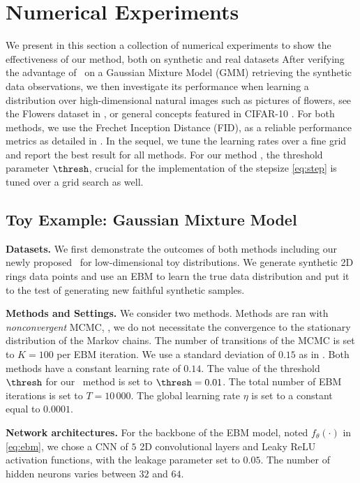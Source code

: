\documentclass[10pt,twocolumn,letterpaper]{article}
\begin{document}
\section{Numerical Experiments}\label{sec:numericals}


We present in this section a collection of numerical experiments to show the effectiveness of our method, both on synthetic and real datasets
After verifying the advantage of \algo\ on a Gaussian Mixture Model (GMM) retrieving the synthetic data observations, we then investigate its performance when learning a distribution over high-dimensional natural images such as pictures of flowers, see the Flowers dataset in \cite{nilsback2008automated}, or general concepts featured in CIFAR-10 \cite{krizhevsky2009learning}.
For both methods, we use the Frechet Inception Distance (FID), as a reliable performance metrics as detailed in \cite{heusel2017gans}.
In the sequel, we tune the learning rates over a fine grid and report the best result for all methods.
For our method \algo, the threshold parameter $\thresh$, crucial for the implementation of the stepsize \eqref{eq:step} is tuned over a grid search as well.

\subsection{Toy Example: Gaussian Mixture Model}

\textbf{Datasets.}
We first demonstrate the outcomes of both methods including our newly proposed \algo\ for low-dimensional toy distributions.
We generate synthetic 2D rings data points and use an EBM to learn the true data distribution and put it to the test of generating new faithful synthetic samples.

\medskip
\textbf{Methods and Settings.}
We consider two methods. 
Methods are ran with \emph{nonconvergent} MCMC, \ie, we do not necessitate the convergence to the stationary distribution of the Markov chains.
The number of transitions of the MCMC is set to $K= 100$ per EBM iteration. 
We use a standard deviation of $0.15$ as in \cite{nijkamp2020anatomy}.
Both methods have a constant learning rate of $0.14$.
The value of the threshold $\thresh$ for our \algo\ method is set to $\thresh = 0.01$.
The total number of EBM iterations is set to $T = 10\,000$.
The global learning rate $\eta$ is set to a constant equal to $0.0001$.

\medskip
\textbf{Network architectures.} 
For the backbone of the EBM model, noted $f_\theta(\cdot)$ in \eqref{eq:ebm}, we chose a CNN of $5$ 2D convolutional layers and Leaky ReLU activation functions, with the leakage parameter set to $0.05$.
The number of hidden neurons varies between $32$ and $64$.
\end{document}
